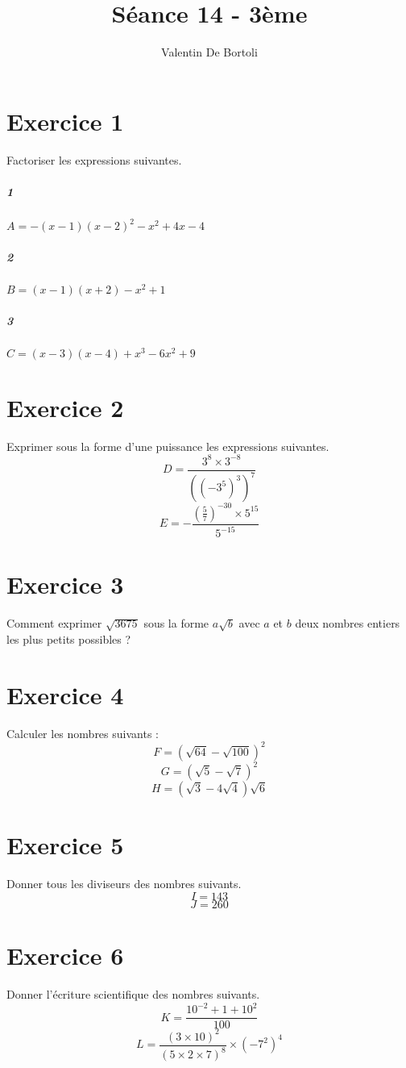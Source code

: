 \documentclass[10pt,a4paper]{article}
\title{Séance 14 - 3ème}
\author{Valentin De Bortoli}
\begin{document}
\maketitle
\section{Exercice 1}
Factoriser les expressions suivantes.
\subparagraph{1} $A= -(x-1)(x-2)^2-x^2+4x-4$
\subparagraph{2} $B=(x-1)(x+2) - x^2 +1$
\subparagraph{3} $C=(x-3)(x-4) +x^3 -6x^2 +9$
\section{Exercice 2}
Exprimer sous la forme d'une puissance les expressions suivantes.
\begin{equation}
D=\frac{3^8 \times 3^{-8}}{((-3^5)^3)^7}
\end{equation}
\begin{equation}
E=-\frac{(\frac{5}{7})^{-30} \times 5^{15}}{5^{-15}}
\end{equation}
\section{Exercice 3}
Comment exprimer $\sqrt{3675}$ sous la forme $a\sqrt{b}$ avec $a$ et $b$ deux nombres entiers les plus petits possibles ?
\section{Exercice 4}
Calculer les nombres suivants :
\begin{equation}
F=(\sqrt{64}-\sqrt{100})^2
\end{equation}
\begin{equation}
G=(\sqrt{5}-\sqrt{7})^2
\end{equation}
\begin{equation}
H=(\sqrt{3}-4\sqrt{4})\sqrt{6}
\end{equation}
\section{Exercice 5}
Donner tous les diviseurs des nombres suivants.
\begin{equation}
I=143
\end{equation}
\begin{equation}
J=260
\end{equation}
\section{Exercice 6}
Donner l'écriture scientifique des nombres suivants.
\begin{equation}
K = \frac{10^{-2}+1+10^2}{100}
\end{equation}
\begin{equation}
L=\frac{(3\times10)^2}{(5 \times 2 \times 7)^8} \times (-7^2)^4
\end{equation}
\end{document}
